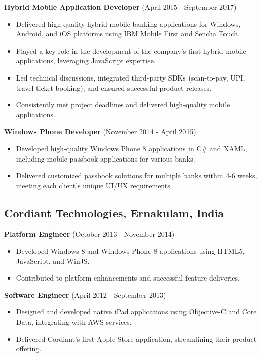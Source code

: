 \documentclass[10pt, letterpaper]{article}
\newenvironment{highlights}{
    \begin{itemize}[
        topsep=0.10cm,
        parsep=0.10cm,
        partopsep=0pt,
        itemsep=0pt,
        leftmargin=0.4cm + 10pt
    ]
}{
    \end{itemize}
}
\begin{document}
\noindent \textbf{Hybrid Mobile Application Developer} (April 2015 - September 2017)
\begin{highlights}
    \item Delivered high-quality hybrid mobile banking applications for Windows, Android, and iOS platforms using IBM Mobile First and Sencha Touch.
    \item Played a key role in the development of the company's first hybrid mobile applications, leveraging JavaScript expertise.
    \item Led technical discussions, integrated third-party SDKs (scan-to-pay, UPI, travel ticket booking), and ensured successful product releases.
    \item Consistently met project deadlines and delivered high-quality mobile applications.
\end{highlights}

\noindent \textbf{Windows Phone Developer} (November 2014 - April 2015)
\begin{highlights}
    \item Developed high-quality Windows Phone 8 applications in C\# and XAML, including mobile passbook applications for various banks.
    \item Delivered customized passbook solutions for multiple banks within 4-6 weeks, meeting each client’s unique UI/UX requirements.
\end{highlights}

\subsection*{Cordiant Technologies, Ernakulam, India}

\noindent \textbf{Platform Engineer} (October 2013 - November 2014)
\begin{highlights}
    \item Developed Windows 8 and Windows Phone 8 applications using HTML5, JavaScript, and WinJS.
    \item Contributed to platform enhancements and successful feature deliveries.
\end{highlights}

\noindent \textbf{Software Engineer} (April 2012 - September 2013)
\begin{highlights}
    \item Designed and developed native iPad applications using Objective-C and Core Data, integrating with AWS services.
    \item Delivered Cordiant’s first Apple Store application, streamlining their product offering.
\end{highlights}
\end{document}
